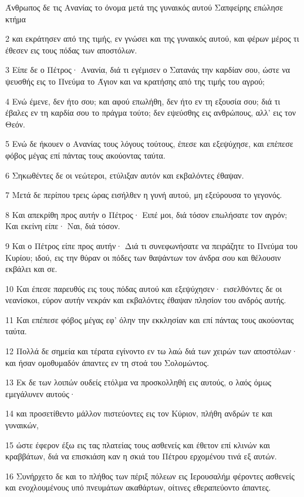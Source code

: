 \par Άνθρωπος δε τις Ανανίας το όνομα μετά της γυναικός αυτού Σαπφείρης επώλησε κτήμα
\par 2 και εκράτησεν από της τιμής, εν γνώσει και της γυναικός αυτού, και φέρων μέρος τι έθεσεν εις τους πόδας των αποστόλων.
\par 3 Είπε δε ο Πέτρος· Ανανία, διά τι εγέμισεν ο Σατανάς την καρδίαν σου, ώστε να ψευσθής εις το Πνεύμα το Άγιον και να κρατήσης από της τιμής του αγρού;
\par 4 Ενώ έμενε, δεν ήτο σου; και αφού επωλήθη, δεν ήτο εν τη εξουσία σου; διά τι έβαλες εν τη καρδία σου το πράγμα τούτο; δεν εψεύσθης εις ανθρώπους, αλλ' εις τον Θεόν.
\par 5 Ενώ δε ήκουεν ο Ανανίας τους λόγους τούτους, έπεσε και εξεψύχησε, και επέπεσε φόβος μέγας επί πάντας τους ακούοντας ταύτα.
\par 6 Σηκωθέντες δε οι νεώτεροι, ετύλιξαν αυτόν και εκβαλόντες έθαψαν.
\par 7 Μετά δε περίπου τρεις ώρας εισήλθεν η γυνή αυτού, μη εξεύρουσα το γεγονός.
\par 8 Και απεκρίθη προς αυτήν ο Πέτρος· Ειπέ μοι, διά τόσον επωλήσατε τον αγρόν; Και εκείνη είπε· Ναι, διά τόσον.
\par 9 Και ο Πέτρος είπε προς αυτήν· Διά τι συνεφωνήσατε να πειράζητε το Πνεύμα του Κυρίου; ιδού, εις την θύραν οι πόδες των θαψάντων τον άνδρα σου και θέλουσιν εκβάλει και σε.
\par 10 Και έπεσε παρευθύς εις τους πόδας αυτού και εξεψύχησεν· εισελθόντες δε οι νεανίσκοι, εύρον αυτήν νεκράν και εκβαλόντες έθαψαν πλησίον του ανδρός αυτής.
\par 11 Και επέπεσε φόβος μέγας εφ' όλην την εκκλησίαν και επί πάντας τους ακούοντας ταύτα.
\par 12 Πολλά δε σημεία και τέρατα εγίνοντο εν τω λαώ διά των χειρών των αποστόλων· και ήσαν ομοθυμαδόν άπαντες εν τη στοά του Σολομώντος.
\par 13 Εκ δε των λοιπών ουδείς ετόλμα να προσκολληθή εις αυτούς, ο λαός όμως εμεγάλυνεν αυτούς·
\par 14 και προσετίθεντο μάλλον πιστεύοντες εις τον Κύριον, πλήθη ανδρών τε και γυναικών,
\par 15 ώστε έφερον έξω εις τας πλατείας τους ασθενείς και έθετον επί κλινών και κραββάτων, διά να επισκιάση καν η σκιά του Πέτρου ερχομένου τινά εξ αυτών.
\par 16 Συνήρχετο δε και το πλήθος των πέριξ πόλεων εις Ιερουσαλήμ φέροντες ασθενείς και ενοχλουμένους υπό πνευμάτων ακαθάρτων, οίτινες εθεραπεύοντο άπαντες.
